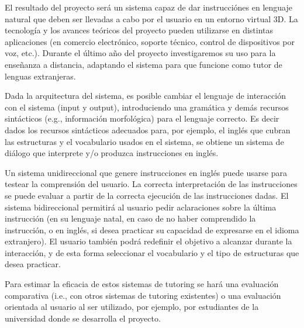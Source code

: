
El resultado del proyecto ser\'a un sistema capaz de dar instrucci\'ones
en lenguaje natural que deben ser llevadas a cabo por el usuario en un
entorno virtual 3D.  La tecnolog\'ia y los avances te\'oricos del proyecto
pueden utilizarse en distintas aplicaciones (en comercio electr\'onico,
soporte t\'ecnico, control de dispositivos por voz, etc.).  Durante el
\'ultimo a\~no del proyecto investigaremos su uso para la ense\~nanza a
distancia, adaptando el sistema para que funcione como tutor de lenguas
extranjeras.

Dada la arquitectura del sistema, es posible cambiar el lenguaje de
interacci\'on con el sistema (input y output), introduciendo
una gram\'atica y dem\'as recursos sint\'acticos (e.g., informaci\'on
morfol\'ogica) para el lenguaje correcto.  Es decir dados los recursos
sint\'acticos adecuados para, por ejemplo, el ingl\'es que cubran las
estructuras y el vocabulario usados en el sistema, se obtiene un sistema
de di\'alogo que interprete y/o produzca instrucciones en ingl\'es.

Un sistema unidireccional que genere instrucciones en ingl\'es puede
usarse para testear la comprensi\'on del usuario.  La correcta
interpretaci\'on de las instrucciones se puede evaluar a partir de la
correcta ejecuci\'on de las instrucciones dadas.  El sistema
bidireccional permitir\'a al usuario pedir aclaraciones sobre la
\'ultima instrucci\'on (en su lenguaje natal, en caso de no haber comprendido
la instrucci\'on, o en ingl\'es, si desea practicar su
capacidad de expresarse en el idioma extranjero).  El usuario tambi\'en
podr\'a redefinir el objetivo a alcanzar durante la interacci\'on, y
de esta forma seleccionar el vocabulario y el tipo de estructuras que desea
practicar.

Para estimar la eficacia de estos sistemas de tutoring se har\'a una evaluaci\'on comparativa (i.e., con otros
sistemas de tutoring existentes) o una evaluaci\'on orientada al usuario al ser utilizado, por ejemplo, por estudiantes de la universidad donde se desarrolla el proyecto.










